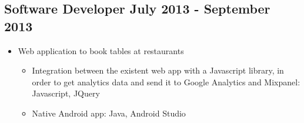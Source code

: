 \subsection{{Software Developer \hfill July 2013 - September 2013}}
\begin{itemize}
\item Web application to book tables at restaurants
\begin{itemize}
    \item Integration between the existent web app with a Javascript library, 
    in order to get analytics data and send it to Google Analytics and Mixpanel: 
    Javascript, JQuery
    \item Native Android app: Java, Android Studio
\end{itemize}
\end{itemize}

